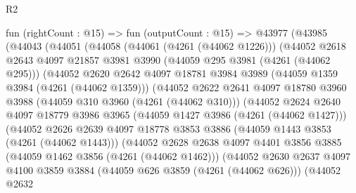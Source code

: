 \begin{lexlean}{R2}
\begin{coremodule}
            fun (rightCount : @15) =>
            fun (outputCount : @15) =>
            @43977
              (@43985
                (@44043
                  (@44051
                    (@44058
                      (@44061 (@4261 (@44062 @1226)))
                      (@44052
                        @2618
                        @2643
                        @4097
                        @21857
                        @3981
                        @3990
                        (@44059 @295 @3981 (@4261 (@44062 @295)))
                        (@44052
                          @2620
                          @2642
                          @4097
                          @18781
                          @3984
                          @3989
                          (@44059 @1359 @3984 (@4261 (@44062 @1359)))
                          (@44052
                            @2622
                            @2641
                            @4097
                            @18780
                            @3960
                            @3988
                            (@44059 @310 @3960 (@4261 (@44062 @310)))
                            (@44052
                              @2624
                              @2640
                              @4097
                              @18779
                              @3986
                              @3965
                              (@44059 @1427 @3986 (@4261 (@44062 @1427)))
                              (@44052
                                @2626
                                @2639
                                @4097
                                @18778
                                @3853
                                @3886
                                (@44059 @1443 @3853 (@4261 (@44062 @1443)))
                                (@44052
                                  @2628
                                  @2638
                                  @4097
                                  @4401
                                  @3856
                                  @3885
                                  (@44059 @1462 @3856 (@4261 (@44062 @1462)))
                                  (@44052
                                    @2630
                                    @2637
                                    @4097
                                    @4100
                                    @3859
                                    @3884
                                    (@44059 @626 @3859 (@4261 (@44062 @626)))
                                    (@44052
                                      @2632

\end{coremodule}
\end{lexlean}
